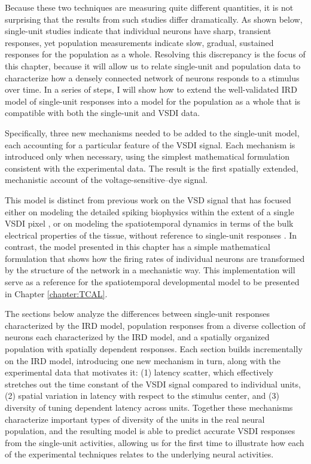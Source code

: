 \documentclass[phd,ianc,twoside]{infthesis}
\begin{document}
Because these two techniques are measuring quite different quantities,
it is not surprising that the results from such studies differ
dramatically. As shown below, single-unit studies indicate that
individual neurons have sharp, transient responses, yet population
measurements indicate slow, gradual, sustained responses for the
population as a whole.  Resolving this discrepancy is the focus of this
chapter, because it will allow us to relate single-unit and population
data to characterize how a densely connected network of neurons responds
to a stimulus over time.  In a series of steps, I will show how to extend the
well-validated IRD model \citep{albrecht_jneurophys02} of single-unit
responses into a model for the population as a whole that is compatible
with both the single-unit and VSDI data.

Specifically, three new mechanisms needed to be added to the
single-unit model, each accounting for a particular feature of the
VSDI signal. Each mechanism is introduced only when necessary, using
the simplest mathematical formulation consistent with the experimental
data. The result is the first spatially extended, mechanistic account
of the voltage-sensitive--dye signal.

This model is distinct from previous work on the VSD signal that has
focused either on modeling the detailed spiking biophysics within the
extent of a single VSDI pixel \citep{chemla_neuroimage10}, or on
modeling the spatiotemporal dynamics in terms of the bulk electrical
properties of the tissue, without reference to single-unit responses
\citep{sit_neuron09}. In contrast, the model presented in this chapter
has a simple mathematical formulation that shows how the firing rates
of individual neurons are transformed by the structure of the network
in a mechanistic way. This implementation will serve as a
reference for the spatiotemporal developmental model to be presented
in Chapter \ref{chapter:TCAL}.

The sections below analyze the differences between single-unit
responses characterized by the IRD model, population responses from a
diverse collection of neurons each characterized by the IRD model, and
a spatially organized population with spatially dependent responses.
Each section builds incrementally on the IRD model, introducing one
new mechanism in turn, along with the experimental data that motivates it: (1) latency
scatter, which effectively stretches out the time constant of the VSDI
signal compared to individual units, (2) spatial variation in latency
with respect to the stimulus center, and (3) diversity of
tuning dependent latency across units.
Together these mechanisms characterize
important types of diversity of the units in the real neural population,
and the resulting model is able to predict accurate VSDI responses
from the single-unit activities, allowing us for the first time to
illustrate how each of the experimental techniques relates to the underlying
neural activities.
\end{document}
